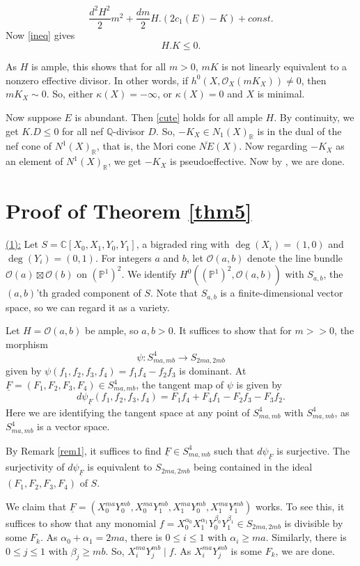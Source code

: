 \documentclass[11pt]{amsart}
\theoremstyle{definition}
\begin{document}
 $$\frac{d^2H^2}{2}m^2+\frac{dm}{2}H.(2c_1(E)-K)+const.$$
 Now \eqref{ineq} gives
 \begin{equation}\label{cute}
     H.K\leq 0.
 \end{equation}

 As $H$ is ample, this shows that for all $m>0$, $mK$ is not linearly
 equivalent to a nonzero effective divisor. In other words, if 
 $h^0(X, \mathcal{O}_X(mK_X))\neq 0$, then $mK_X\sim 0.$ So, either 
$\kappa(X)=-\infty$, or $\kappa(X)=0$ and $X$ is minimal.

Now suppose $E$ is abundant. Then \eqref{cute} holds for all ample $H$.
By continuity, we get $K.D\leq 0$ for all nef $\mathbb{Q}$-divisor $D$.
So, $-K_X\in N_1(X)_{\mathbb{R}}$ is in the dual of the nef cone of 
$N^1(X)_{\mathbb{R}}$, that is, the Mori cone $\overline{NE}(X)$. Now
regarding $-K_X$ as an element of $N^1(X)_{\mathbb{R}}$, we get $-K_X$ 
is pseudoeffective. Now by {\cite[Theorem 1.3]{LX}}, we are done.
\section{Proof of Theorem \ref{thm5}}

\underline{(1):} Let $S=\mathbb{C}[X_0,X_1,Y_0,Y_1]$, a bigraded ring 
with $\deg (X_i)=(1,0)$ and $\deg (Y_i)=(0,1)$. For integers $a$ and 
$b$, let $\mathcal{O}(a,b)$ denote the line bundle $\mathcal{O}
(a)\boxtimes\mathcal{O}(b)$ on $(\mathbb{P}^1)^2$. We identify 
$H^0((\mathbb{P}^1)^2, \mathcal{O}(a,b))$ with $S_{a,b}$, 
the $(a,b)$'th graded component of $S$. Note that $S_{a,b}$ is a 
finite-dimensional vector space, so we can regard it as a variety.

Let $H=\mathcal{O}(a,b)$ be ample, so $a,b>0.$ It suffices to show 
that for $m>>0$, the morphism 
$$\psi: S_{ma,mb}^4\to S_{2ma,2mb}$$ given by 
$\psi(f_1,f_2,f_3,f_4)=f_1f_4-f_2f_3$ is dominant. At $\underline{F}=
(F_1,F_2,F_3,F_4)\in S_{ma,mb}^4$, the tangent map of $\psi$ is given by
$$d\psi_{\underline{F}}(f_1,f_2,f_3,f_4)=F_1f_4+F_4f_1-F_2f_3-F_3f_2.$$
Here we are identifying the tangent space at any point of $S_{ma,mb}^4$
with $S_{ma,mb}^4$, as $S_{ma,mb}^4$ is a vector space.

By Remark \ref{rem1}, it suffices to find $\underline{F}\in S_{ma,mb}^4$
such that $d\psi_{\underline{F}}$ is surjective. The surjectivity of 
$d\psi_{\underline{F}}$ is equivalent to $S_{2ma,2mb}$ being contained 
in the ideal $(F_1,F_2,F_3,F_4)$ of $S$.

We claim that $\underline{F}=(X_0^{ma}Y_0^{mb}, X_0^{ma}Y_1^{mb}, 
X_1^{ma}Y_0^{mb},X_1^{ma}Y_1^{mb})$ works. To see this, it suffices to 
show that any monomial 
$f=X_0^{\alpha_0}X_1^{\alpha_1}Y_0^{\beta_0}Y_1^{\beta_1}\in 
S_{2ma,2mb}$ is divisible by some $F_k$. As $\alpha_0+\alpha_1=2ma$, 
there is $0\leq i\leq 1$ with $\alpha_i\geq ma$. Similarly, there is
$0\leq j\leq 1$ with $\beta_j\geq mb$. So, $X_i^{ma}Y_j^{mb}\mid f$. As
$X_i^{ma}Y_j^{mb}$ is some $F_k$, we are done.
\end{document}
